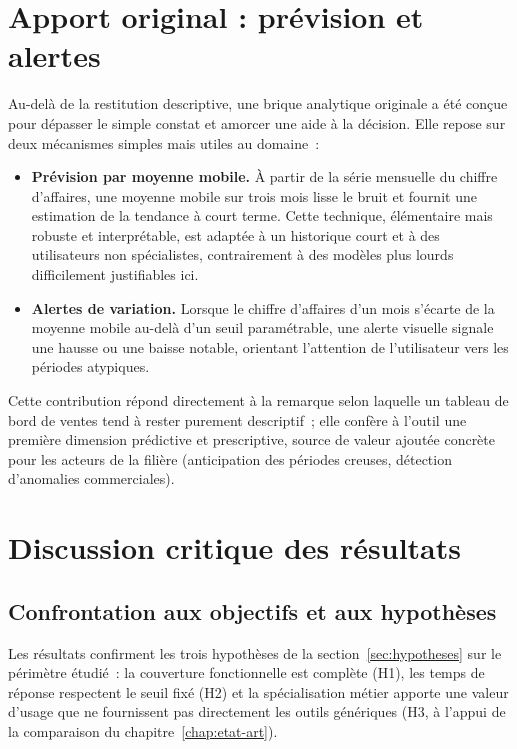 \documentclass[11pt,a4paper]{report}
\begin{document}
\section{Apport original : prévision et alertes}
\label{sec:apport-original}
Au-delà de la restitution descriptive, une brique analytique originale a été
conçue pour dépasser le simple constat et amorcer une aide à la décision. Elle
repose sur deux mécanismes simples mais utiles au domaine~:
\begin{itemize}
  \item \textbf{Prévision par moyenne mobile.} À partir de la série mensuelle du
        chiffre d'affaires, une moyenne mobile sur trois mois lisse le bruit et
        fournit une estimation de la tendance à court terme. Cette technique,
        élémentaire mais robuste et interprétable, est adaptée à un historique
        court et à des utilisateurs non spécialistes, contrairement à des
        modèles plus lourds difficilement justifiables ici.
  \item \textbf{Alertes de variation.} Lorsque le chiffre d'affaires d'un mois
        s'écarte de la moyenne mobile au-delà d'un seuil paramétrable, une alerte
        visuelle signale une hausse ou une baisse notable, orientant l'attention
        de l'utilisateur vers les périodes atypiques.
\end{itemize}
Cette contribution répond directement à la remarque selon laquelle un tableau de
bord de ventes tend à rester purement descriptif~; elle confère à l'outil une
première dimension prédictive et prescriptive, source de valeur ajoutée concrète
pour les acteurs de la filière (anticipation des périodes creuses, détection
d'anomalies commerciales).

\section{Discussion critique des résultats}
\label{sec:discussion}
\subsection{Confrontation aux objectifs et aux hypothèses}
Les résultats confirment les trois hypothèses de la section~\ref{sec:hypotheses}
sur le périmètre étudié~: la couverture fonctionnelle est complète (H1), les
temps de réponse respectent le seuil fixé (H2) et la spécialisation métier
apporte une valeur d'usage que ne fournissent pas directement les outils
génériques (H3, à l'appui de la comparaison du chapitre~\ref{chap:etat-art}).
\end{document}
